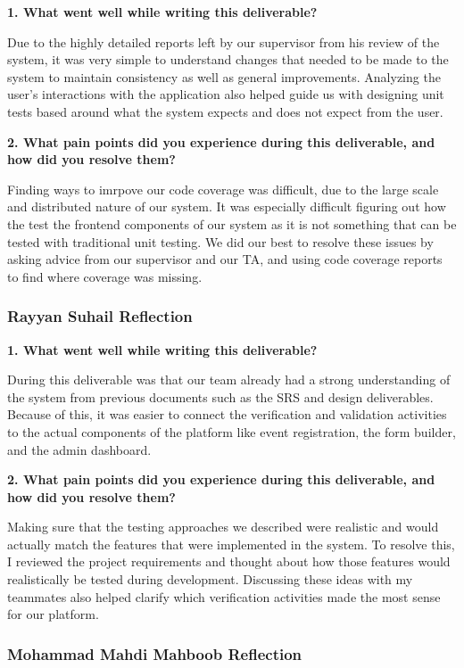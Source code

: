 \documentclass[12pt, titlepage]{article}
\begin{document}
\textbf{1. What went well while writing this deliverable?}

Due to the highly detailed reports left by our supervisor from his review of the system, it was very simple to understand changes that needed to be made to the system to maintain consistency as well as general improvements. Analyzing the user's interactions with the application also helped guide us with designing unit tests based around what the system expects and does not expect from the user.

\textbf{2. What pain points did you experience during this deliverable,
and how did you resolve them?}

Finding ways to imrpove our code coverage was difficult, due to the large scale and distributed nature of our system. It was especially difficult figuring out how the test the frontend components of our system as it is not something that can be tested with traditional unit testing. We did our best to resolve these issues by asking advice from our supervisor and our TA, and using code coverage reports to find where coverage was missing.   

\subsubsection*{Rayyan Suhail Reflection}

\textbf{1. What went well while writing this deliverable?}

During this deliverable was that our team already
had a strong understanding of the system from previous documents such as
the SRS and design deliverables. Because of this, it was easier to connect
the verification and validation activities to the actual components of the
platform like event registration, the form builder, and the admin dashboard.

\textbf{2. What pain points did you experience during this deliverable,
and how did you resolve them?}

Making sure that the testing approaches we described were realistic and would actually match the features that were implemented in the system.
To resolve this, I reviewed the project requirements and thought about
how those features would realistically be tested during development.
Discussing these ideas with my teammates also helped clarify which
verification activities made the most sense for our platform.

\subsubsection*{Mohammad Mahdi Mahboob Reflection}
\end{document}
